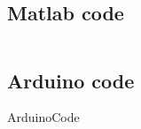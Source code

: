 \addappendix

\subsection{Matlab code}
\label{apx:matlab}
\inputminted[breaklines]{Matlab}{./Code/PID-Matlab_v2.m}
\newpage

\subsection{Arduino code}
\label{apx:Arduino}
{ArduinoCode}